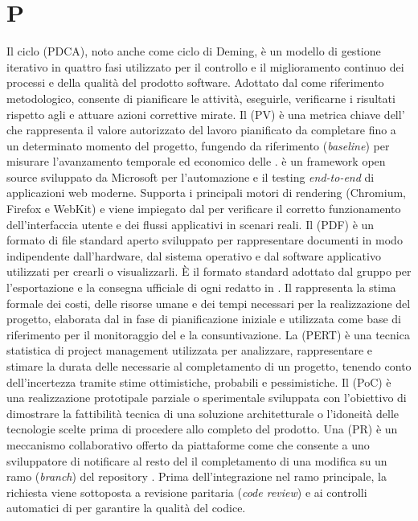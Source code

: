 \section{P}
Il ciclo  (PDCA), noto anche come ciclo di Deming, è un modello di gestione iterativo in quattro fasi utilizzato per il controllo e il miglioramento continuo dei processi e della qualità del prodotto software. Adottato dal  come riferimento metodologico, consente di pianificare le attività, eseguirle, verificarne i risultati rispetto agli  e attuare azioni correttive mirate.
Il  (PV) è una metrica chiave dell' che rappresenta il valore autorizzato del lavoro pianificato da completare fino a un determinato momento del progetto, fungendo da riferimento (\emph{baseline}) per misurare l'avanzamento temporale ed economico delle .
 è un framework open source sviluppato da Microsoft per l'automazione e il testing \emph{end-to-end} di applicazioni web moderne. Supporta i principali motori di rendering (Chromium, Firefox e WebKit) e viene impiegato dal  per verificare il corretto funzionamento dell'interfaccia utente e dei flussi applicativi in scenari reali.
Il  (PDF) è un formato di file standard aperto sviluppato per rappresentare documenti in modo indipendente dall'hardware, dal sistema operativo e dal software applicativo utilizzati per crearli o visualizzarli. È il formato standard adottato dal gruppo per l'esportazione e la consegna ufficiale di ogni  redatto in .
Il  rappresenta la stima formale dei costi, delle risorse umane e dei tempi necessari per la realizzazione del progetto, elaborata dal  in fase di pianificazione iniziale e utilizzata come base di riferimento per il monitoraggio del  e la consuntivazione.
La  (PERT) è una tecnica statistica di project management utilizzata per analizzare, rappresentare e stimare la durata delle  necessarie al completamento di un progetto, tenendo conto dell'incertezza tramite stime ottimistiche, probabili e pessimistiche.
Il  (PoC) è una realizzazione prototipale parziale o sperimentale sviluppata con l'obiettivo di dimostrare la fattibilità tecnica di una soluzione architetturale o l'idoneità delle tecnologie scelte prima di procedere allo  completo del prodotto.
Una  (PR) è un meccanismo collaborativo offerto da piattaforme come  che consente a uno sviluppatore di notificare al resto del  il completamento di una modifica su un ramo (\emph{branch}) del repository . Prima dell'integrazione nel ramo principale, la richiesta viene sottoposta a revisione paritaria (\emph{code review}) e ai controlli automatici di  per garantire la qualità del codice.
